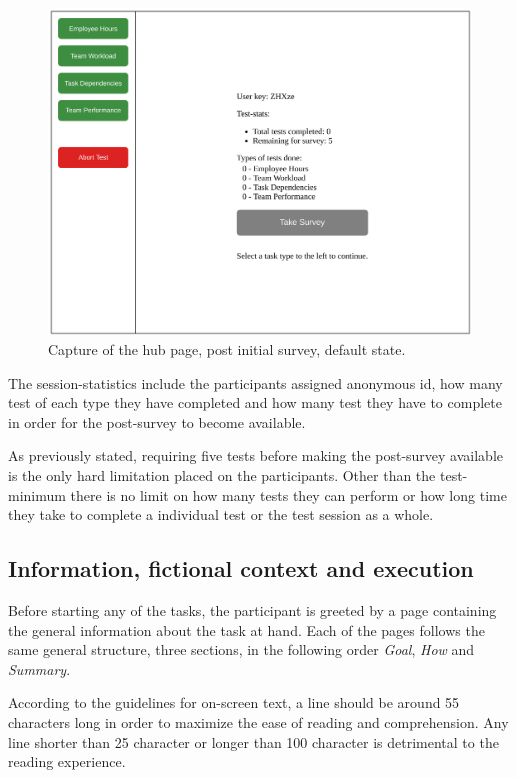 {  \begin{figure}[h!]
    \centering
    \includegraphics[width=.7\textwidth]{figures/captures/webapp_main_statistics.pdf}
    \caption{Capture of the hub page, post initial survey, default state.}
    \label{label_mainStatistics}
  \end{figure}

  The session-statistics include the participants assigned anonymous id,
  how many test of each type they have completed and how many test they
  have to complete in order for the post-survey to become available.

  As previously stated, requiring five tests before making the post-survey
  available is the only hard limitation placed on the participants. Other than
  the test-minimum there is no limit on how many tests they can perform or how
  long time they take to complete a individual test or the test session as a
  whole.

  \subsection{Information, fictional context and execution}

  Before starting any of the tasks, the participant is greeted by a page
  containing the general information about the task at hand. Each of the pages
  follows the same general structure, three sections, in the following order
  \textit{Goal}, \textit{How} and \textit{Summary}.

  According to the guidelines for on-screen
  text\cite{citeOptimalLineLengthinReadingALiteratureReview}, a line should be
  around 55 characters long in order to maximize the ease of reading and
  comprehension. Any line shorter than 25 character or longer than 100
  character is detrimental to the reading experience.

}
